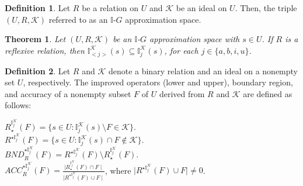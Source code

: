\documentclass{article}
\theoremstyle{theorem}
\newtheorem{theorem}{Theorem}[section]
\theoremstyle{definition}
\newtheorem{definition}{Definition}[section]
\theoremstyle{remark}
\begin{document}
\begin{definition} \label{d111} Let $R$ be a relation on $U$ and $\mathcal{K}$ be an ideal on $U$. Then, the triple $(U, R, \mathcal{K})$ referred to as an $\mathbb{I}$-$G$ approximation space.
\end{definition}

\begin{theorem}\label{t104} \cite{Al-shami 2024} Let $(U, R, \mathcal{K})$ be an $\mathbb{I}$-$G$ approximation space with $s\in U$.
 If $R$ is a reflexive relation, then $\mathbb{I}^{\mathcal{K}}_{<j>}(s) \subseteq \mathbb{I}^{\mathcal{K}}_{j}(s)$, for each $j \in \{a, b, i, u\}$.
\end{theorem}

\begin{definition} \label{d13} \cite{Al-shami 2024} Let $R$  and $\mathcal{K}$ denote a binary relation and an ideal on a nonempty set $U$, respectively. The improved operators (lower and upper), boundary region, and accuracy of a nonempty subset $F$ of $U$ derived from $R$ and $\mathcal{K}$ are defined as follows:
\begin{center}
$R_{\star}^{\mathbb{I}_{j}^{\mathcal{K}}}(F) = \{s \in U : \mathbb{I}^{\mathcal{K}}_{j}(s) \setminus F \in \mathcal{K}\}$.\\
$R^{\star\mathbb{I}_{j}^{\mathcal{K}}}(F) = \{s \in U : \mathbb{I}^{\mathcal{K}}_{j}(s)\cap F \not\in \mathcal{K}\}$.\\
$BND_{R}^{\star\mathbb{I}_{j}^{\mathcal{K}}}(F) = R^{\star\mathbb{I}_{j}^{\mathcal{K}}}(F) \setminus R_{\star}^{\mathbb{I}_{j}^{\mathcal{K}}}(F)$.\\
$ACC_{R}^{\star\mathbb{I}_{j}^{\mathcal{K}}}(F) = \frac{\mid R_{\star}^{\mathbb{I}_{j}^{\mathcal{K}}}(F)\cap F\mid}{\mid R^{\star\mathbb{I}_{j}^{\mathcal{K}}}(F)\cup F\mid}$, where $\mid R^{\star\mathbb{I}_{j}^{\mathcal{K}}}(F)\cup F\mid\neq0$.\\
\end{center}
\end{definition}
\end{document}
